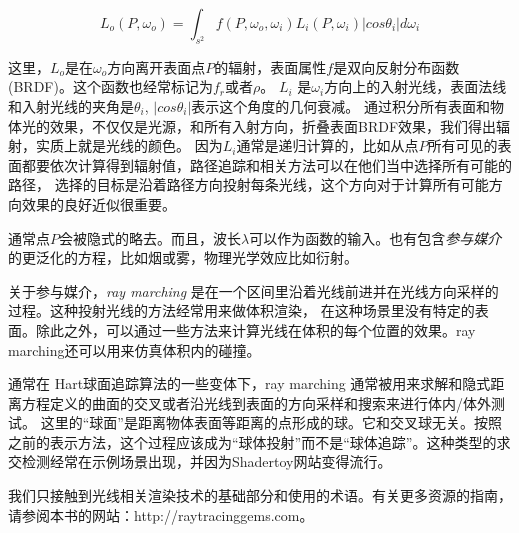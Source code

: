 \documentclass[12pt]{article}
\begin{document}
\begin{equation}
L_o(P, \omega_o) = \int_{s^2} f(P, \omega_o,\omega_i)L_i(P,\omega_i) |cos\theta_i|d\omega_i
\end{equation}

这里，$L_o$是在$\omega_o$方向离开表面点$P$的辐射，表面属性$f$是双向反射分布函数(BRDF)。这个函数也经常标记为$f_r$或者$\rho$。
 $L_i$ 是$\omega_i$方向上的入射光线，表面法线和入射光线的夹角是$\theta_i$, $|cos \theta_i|$表示这个角度的几何衰减。
 通过积分所有表面和物体光的效果，不仅仅是光源，和所有入射方向，折叠表面BRDF效果，我们得出辐射，实质上就是光线的颜色。
 因为$L_i$通常是递归计算的，比如从点$P$所有可见的表面都要依次计算得到辐射值，路径追踪和相关方法可以在他们当中选择所有可能的路径，
 选择的目标是沿着路径方向投射每条光线，这个方向对于计算所有可能方向效果的良好近似很重要。

通常点$P$会被隐式的略去。而且，波长$\lambda$可以作为函数的输入。也有包含\textit{参与媒介}的更泛化的方程，比如烟或雾，物理光学效应比如衍射。

关于参与媒介，\textit{ray marching} 是在一个区间里沿着光线前进并在光线方向采样的过程。这种投射光线的方法经常用来做体积渲染，
在这种场景里没有特定的表面。除此之外，可以通过一些方法来计算光线在体积的每个位置的效果。ray marching还可以用来仿真体积内的碰撞。

通常在 Hart球面追踪算法\cite{Hart1996}的一些变体下，ray marching 通常被用来求解和隐式距离方程定义的曲面的交叉或者沿光线到表面的方向采样和搜索来进行体内/体外测试。
这里的“球面”是距离物体表面等距离的点形成的球。它和交叉球无关。按照之前的表示方法，这个过程应该成为“球体投射”而不是“球体追踪”。这种类型的求交检测经常在示例场景出现，并因为Shadertoy网站变得流行。

我们只接触到光线相关渲染技术的基础部分和使用的术语。有关更多资源的指南，请参阅本书的网站：http://raytracinggems.com。
 


\end{document}

